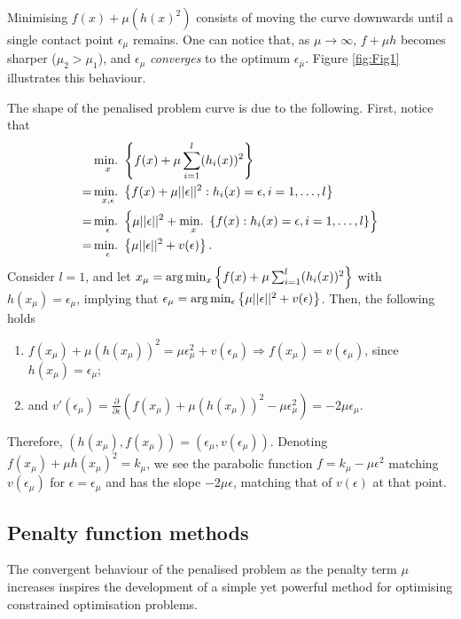 Minimising $f(x) + \mu(h(x)^2)$ consists of moving the curve downwards until a single contact point $\epsilon_\mu$ remains. One can notice that, as $\mu \rightarrow \infty$, $f + \mu h$ becomes sharper ($\mu_2 > \mu_1$), and $\epsilon_\mu$ \emph{converges} to the optimum $\epsilon_{\overline{\mu}}$. Figure \ref{fig:Fig1} illustrates this behaviour.

The shape of the penalised problem curve is due to the following. First, notice that
%
\begin{align*}
&\mathop{\text{min.~}}_x \left\{ f(x) + \mu \sum_{i=1}^l(h_i(x))^2 \right \} \\
= & \mathop{\text{min.~}}_{x,\epsilon}\left\{ f(x) + \mu ||\epsilon||^2 : h_i(x) = \epsilon, i = 1,\dots, l \right \}\\
= & \mathop{\text{min.~}}_{\epsilon}\left\{  \mu||\epsilon||^2 + \mathop{\text{min.~}}_{x} \left\{ f(x) : h_i(x) = \epsilon, i = 1, \dots, l \right \} \right \} \\
= & \mathop{\text{min.~}}_{\epsilon}\left\{ \mu||\epsilon||^2 + v(\epsilon) \right \}.
\end{align*}
%
Consider $l=1$, and let $x_\mu = \arg\min_x \left\{ f(x) + \mu \sum_{i=1}^l(h_i(x))^2 \right \}$ with $h(x_\mu) = \epsilon_\mu$, implying that $\epsilon_\mu = \arg\min_{\epsilon}\left\{ \mu||\epsilon||^2 + v(\epsilon) \right \}$. Then, the following holds
\begin{enumerate}
\item $f(x_\mu) + \mu(h(x_\mu))^2 = \mu \epsilon_\mu^2 + v(\epsilon_\mu) \Rightarrow f(x_\mu) = v(\epsilon_\mu)$, since $h(x_\mu) = \epsilon_\mu$; 
\item and $v'(\epsilon_\mu) = \frac{\partial}{\partial \epsilon}(f(x_\mu) + \mu(h(x_\mu))^2 - \mu\epsilon_\mu^2) = -2\mu\epsilon_\mu$. 
\end{enumerate}

Therefore, $(h(x_\mu), f(x_\mu)) = (\epsilon_\mu, v(\epsilon_\mu))$. Denoting $f(x_\mu) + \mu h(x_\mu)^2 = k_\mu$, we see the parabolic function $f = k_\mu - \mu\epsilon^2$ matching $v(\epsilon_\mu)$ for $\epsilon=\epsilon_\mu$ and has the slope $-2\mu \epsilon$, matching that of $v(\epsilon)$ at that point.


\subsection{Penalty function methods}


The convergent behaviour of the penalised problem as the penalty term $\mu$ increases inspires the development of a simple yet powerful method for optimising constrained optimisation problems. 

